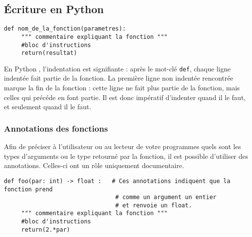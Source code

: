 \subsection{\'Ecriture en Python }

\begin{lstlisting}
def nom_de_la_fonction(parametres):
     """ commentaire expliquant la fonction """
     #bloc d'instructions
     return(resultat)
\end{lstlisting}

\begin{remarque}
En Python , l'indentation est {signifiante} : après le mot-clé \texttt{def}, chaque 
ligne indentée fait partie de la fonction. La première ligne non indentée rencontrée marque la 
fin de la fonction : cette ligne ne fait plus partie de la fonction, mais celles qui précéde en 
font partie. Il est donc {impératif} d'indenter quand il le faut, et seulement 
quand il le faut.%
\end{remarque}

\subsubsection*{Annotations des fonctions}

Afin de préciser à l'utilisateur ou au lecteur de votre programmes quels sont les types d'arguments ou le type retourné par la fonction, il est possible d'utiliser des annotations. Celles-ci ont un rôle uniquement documentaire.
\begin{lstlisting}
def foo(par: int) -> float :   # Ces annotations indiquent que la fonction prend 
                                # comme un argument un entier 
                                # et renvoie un float.
     """ commentaire expliquant la fonction """
     #bloc d'instructions
     return(2.*par)
\end{lstlisting}


